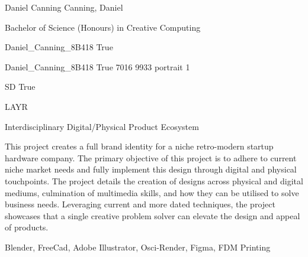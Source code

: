 
\begingroup{}\relax



\def\Key{Daniel_Canning_8B418}

{Daniel Canning}
{Canning, Daniel}

{Bachelor of Science (Honours) in Creative Computing}

{Daniel_Canning_8B418}
{True}

{Daniel_Canning_8B418}
{True}
{7016}
{9933}
{portrait}
{1}

{SD}
{True}

{LAYR}

{Interdisciplinary Digital/Physical Product Ecosystem}

{This project creates a full brand identity for a niche retro-modern startup hardware company. The primary objective
of this project is to adhere to current niche market needs and fully implement this design through digital and
physical touchpoints. The project details the creation of designs across physical and digital mediums, culmination of
multimedia skills, and how they can be utilised to solve business needs. Leveraging current and more dated
techniques, the project showcases that a single creative problem solver can elevate the design and appeal of
products.}

{Blender, FreeCad, Adobe Illustrator, Osci-Render, Figma, FDM Printing}

